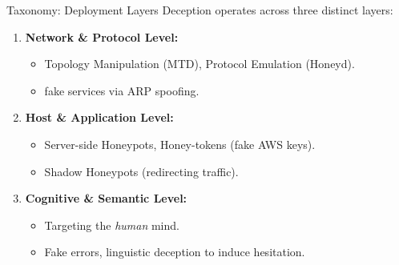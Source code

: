\documentclass[12pt, aspectratio=169]{beamer}
\begin{document}
\begin{frame}{Taxonomy: Deployment Layers}
    Deception operates across three distinct layers:

    \begin{enumerate}
        \item \textbf{Network \& Protocol Level:}
              \begin{itemize}
                  \item Topology Manipulation (MTD), Protocol Emulation (Honeyd).
                  \item fake services via ARP spoofing.
              \end{itemize}

        \item \textbf{Host \& Application Level:}
              \begin{itemize}
                  \item Server-side Honeypots, Honey-tokens (fake AWS keys).
                  \item Shadow Honeypots (redirecting traffic).
              \end{itemize}

        \item \textbf{Cognitive \& Semantic Level:}
              \begin{itemize}
                  \item Targeting the \textit{human} mind.
                  \item Fake errors, linguistic deception to induce hesitation.
              \end{itemize}
    \end{enumerate}
\end{frame}
\end{document}
